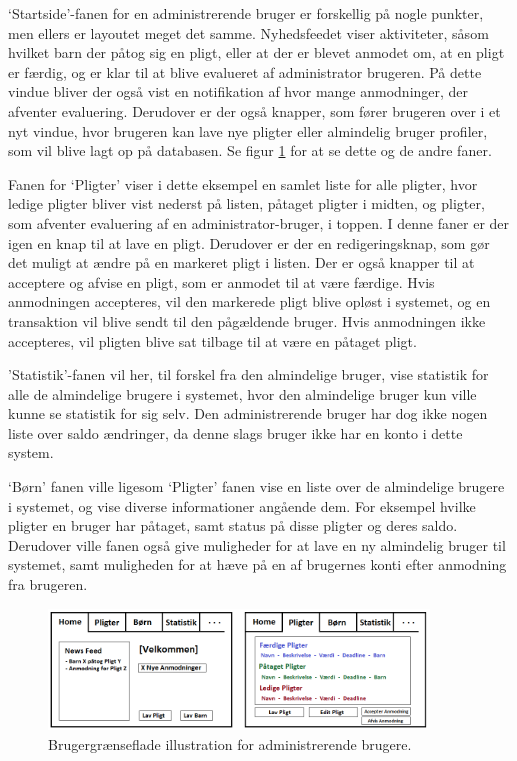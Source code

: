 ‘Startside’-fanen for en administrerende bruger er forskellig på nogle punkter, men ellers er layoutet meget det samme. Nyhedsfeedet viser aktiviteter, såsom hvilket barn der påtog sig en pligt, eller at der er blevet anmodet om, at en pligt er færdig, og er klar til at blive evalueret af administrator brugeren. På dette vindue bliver der også vist en notifikation af hvor mange anmodninger, der afventer evaluering. Derudover er der også knapper, som fører brugeren over i et nyt vindue, hvor brugeren kan lave nye pligter eller almindelig bruger profiler, som vil blive lagt op på databasen. Se figur \ref{ForalderUI} for at se dette og de andre faner.

Fanen for ‘Pligter’ viser i dette eksempel en samlet liste for alle pligter, hvor ledige pligter bliver vist nederst på listen, påtaget pligter i midten, og pligter, som afventer evaluering af en administrator-bruger, i toppen. I denne faner er der igen en knap til at lave en pligt. Derudover er der en  redigeringsknap, som gør det muligt at ændre på en markeret pligt i listen. Der er også knapper til at acceptere og afvise en pligt, som er anmodet til at være færdige. Hvis anmodningen accepteres, vil den markerede pligt blive opløst i systemet, og en transaktion vil blive sendt til den pågældende bruger. Hvis anmodningen ikke accepteres, vil pligten blive sat tilbage til at være en påtaget pligt. 

'Statistik'-fanen vil her, til forskel fra den almindelige bruger, vise statistik for alle de almindelige brugere i systemet, hvor den almindelige bruger kun ville kunne se statistik for sig selv. Den administrerende bruger har dog ikke nogen liste over saldo ændringer, da denne slags bruger ikke har en konto i dette system. 

‘Børn’ fanen ville ligesom ‘Pligter’ fanen vise en liste over de almindelige brugere i systemet, og vise diverse informationer angående dem. For eksempel hvilke pligter en bruger har påtaget, samt status på disse pligter og deres saldo. Derudover ville fanen også give muligheder for at lave en ny almindelig bruger til systemet, samt muligheden for at hæve på en af brugernes konti efter anmodning fra brugeren.

\begin{figure}[H]
\centering
\includegraphics[width=0.9\textwidth]{Billeder/ForalderUI.png}
\caption{Brugergrænseflade illustration for administrerende brugere.}
\label{ForalderUI}
\end{figure}
